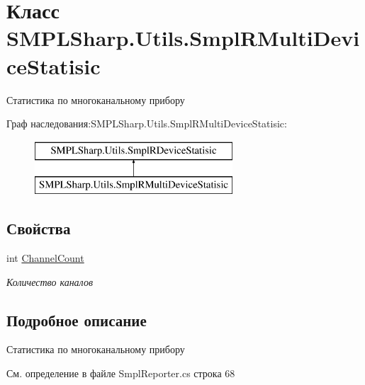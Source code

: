 \hypertarget{class_s_m_p_l_sharp_1_1_utils_1_1_smpl_r_multi_device_statisic}{\section{Класс S\-M\-P\-L\-Sharp.\-Utils.\-Smpl\-R\-Multi\-Device\-Statisic}
\label{de/d2e/class_s_m_p_l_sharp_1_1_utils_1_1_smpl_r_multi_device_statisic}
}


Статистика по многоканальному прибору  


Граф наследования\-:S\-M\-P\-L\-Sharp.\-Utils.\-Smpl\-R\-Multi\-Device\-Statisic\-:\begin{figure}[H]
\begin{center}
\leavevmode
\includegraphics[height=2.000000cm]{de/d2e/class_s_m_p_l_sharp_1_1_utils_1_1_smpl_r_multi_device_statisic}
\end{center}
\end{figure}
\subsection*{Свойства}
\begin{DoxyCompactItemize}
\item 
int \hyperlink{class_s_m_p_l_sharp_1_1_utils_1_1_smpl_r_multi_device_statisic_a918293b0514cc2084174138c94f3a56c}{Channel\-Count}
\begin{DoxyCompactList}\small\item\em Количество каналов \end{DoxyCompactList}\end{DoxyCompactItemize}


\subsection{Подробное описание}
Статистика по многоканальному прибору 



См. определение в файле Smpl\-Reporter.\-cs строка 68



